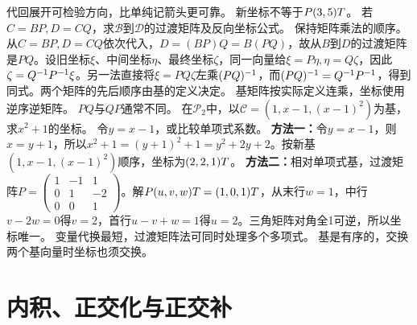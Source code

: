 {代回展开可检验方向，比单纯记箭头更可靠。}
{新坐标不等于$P(3,5)T$。}
{若$C=BP,D=CQ$，求$\mathcal B$到$\mathcal D$的过渡矩阵及反向坐标公式。}
{保持矩阵乘法的顺序。}
{从$C=BP,D=CQ$依次代入，$D=(BP)Q=B(PQ)$，故从$B$到$D$的过渡矩阵是$PQ$。设旧坐标$\xi$、中间坐标$\eta$、最终坐标$\zeta$，同一向量给$\xi=P\eta,\eta=Q\zeta$，因此$\zeta=Q^{-1} P^{-1}\xi$。另一法直接将$\xi=PQ\zeta$左乘$(PQ)^{-1}$，而$(PQ)^{-1}=Q^{-1} P^{-1}$，得到同式。两个矩阵的先后顺序由基的定义决定。}
{基矩阵按实际定义连乘，坐标使用逆序逆矩阵。}
{$PQ$与$QP$通常不同。}
{在$\mathcal P_2$中，以$\mathcal C=(1,x-1,(x-1)^2)$为基，求$x^2+1$的坐标。}
{令$y=x-1$，或比较单项式系数。}
{\textbf{方法一：}令$y=x-1$，则$x=y+1$，所以$x^2+1=(y+1)^2+1=y^2+2y+2$。按新基$(1,x-1,(x-1)^2)$顺序，坐标为$(2,2,1)T$。
\textbf{方法二：}相对单项式基，过渡矩阵$P=\begin{pmatrix}1&-1&1\\0&1&-2\\0&0&1\end{pmatrix}$。解$P(u,v,w)T=(1,0,1)T$，从末行$w=1$，中行$v-2w=0$得$v=2$，首行$u-v+w=1$得$u=2$。三角矩阵对角全1可逆，所以坐标唯一。}
{变量代换最短，过渡矩阵法可同时处理多个多项式。}
{基是有序的，交换两个基向量时坐标也须交换。}
\section{内积、正交化与正交补}

